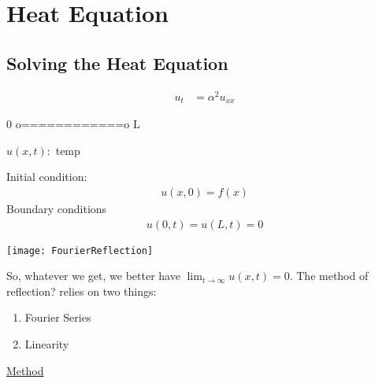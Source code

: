 \newpage
\section{Heat Equation}

\subsection{Solving the Heat Equation}


\begin{align}
  u_t & = \alpha^2 u_{xx}
\end{align}

\begin{center}
  0 o============o L

  $u(x, t) : $ temp
\end{center}

Initial condition:
%
\begin{align}
  u(x, 0) = f(x)
\end{align}
Boundary conditions
%
\begin{align}
  u(0, t) = u(L, t) = 0
\end{align}

\begin{center}
  \texttt{[image: FourierReflection]}
\end{center}

So, whatever we get, we better have
$\displaystyle \lim_{t \to \infty} u(x, t) = 0$.
The method of reflection? relies on two things:

\begin{enumerate}
  \item Fourier Series
  \item Linearity
\end{enumerate}

\underline{Method}


